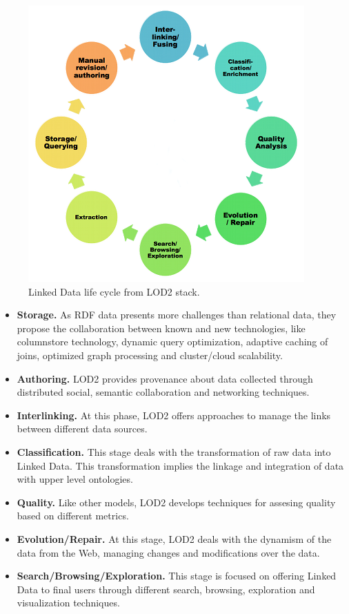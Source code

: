 \begin{figure}
    \center
    \includegraphics[scale=0.6]{img/data_lifecycle/lod2lifecyle1.png}
    \caption{Linked Data life cycle from LOD2 stack.}
    \label{fig:lod2}
\end{figure}

\begin{itemize}
    \item \textbf{Storage.} As RDF data presents more challenges than relational data, they propose the collaboration between known and new technologies, like columnstore technology, dynamic query optimization, adaptive caching of joins, optimized graph processing and cluster/cloud scalability.

    \item \textbf{Authoring.} LOD2 provides provenance about data collected through distributed social, semantic collaboration and networking techniques.

    \item \textbf{Interlinking.} At this phase, LOD2 offers approaches to manage the links between different data sources.

    \item \textbf{Classification.} This stage deals with the transformation of raw data into Linked Data. This transformation implies the linkage and integration of data with upper level ontologies.

    \item \textbf{Quality.} Like other models, LOD2 develops techniques for assesing quality based on different metrics.

    \item \textbf{Evolution/Repair.} At this stage, LOD2 deals with the dynamism of the data from the Web, managing changes and modifications over the data.

    \item \textbf{Search/Browsing/Exploration.} This stage is focused on offering Linked Data to final users through different search, browsing, exploration and visualization techniques.
\end{itemize}

